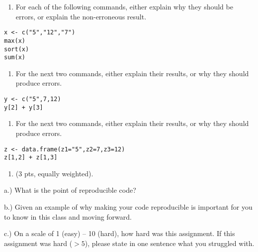 \documentclass[
]{article}
\providecommand{\tightlist}{%
  \setlength{\itemsep}{0pt}\setlength{\parskip}{0pt}}
\begin{document}
\begin{enumerate}
\def\labelenumi{\alph{enumi}.}
\tightlist
\item
  For each of the following commands, either explain why they should be
  errors, or explain the non-erroneous result.
\end{enumerate}

\begin{verbatim}
x <- c("5","12","7")
max(x)
sort(x)
sum(x)
\end{verbatim}

\begin{enumerate}
\def\labelenumi{\alph{enumi}.}
\setcounter{enumi}{1}
\tightlist
\item
  For the next two commands, either explain their results, or why they
  should produce errors.
\end{enumerate}

\begin{verbatim}
y <- c("5",7,12)
y[2] + y[3]
\end{verbatim}

\begin{enumerate}
\def\labelenumi{\alph{enumi}.}
\setcounter{enumi}{2}
\tightlist
\item
  For the next two commands, either explain their results, or why they
  should produce errors.
\end{enumerate}

\begin{verbatim}
z <- data.frame(z1="5",z2=7,z3=12)
z[1,2] + z[1,3]
\end{verbatim}

\begin{enumerate}
\def\labelenumi{\arabic{enumi}.}
\setcounter{enumi}{2}
\tightlist
\item
  (3 pts, equally weighted).
\end{enumerate}

a.) What is the point of reproducible code?

b.) Given an example of why making your code reproducible is important
for you to know in this class and moving forward.

c.) On a scale of 1 (easy) -- 10 (hard), how hard was this assignment.
If this assignment was hard (\(>5\)), please state in one sentence what
you struggled with.
\end{document}
